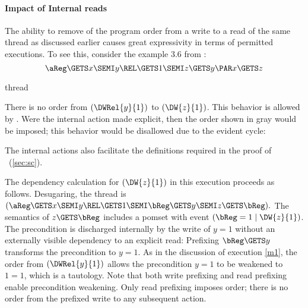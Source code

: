 \paragraph{Impact of Internal reads}
The ability to remove of the program order from a write to a read of the same thread as discussed earlier causes great expressivity in terms of permitted executions.  To see this, consider the example 3.6 from
\cite{DBLP:journals/pacmpl/PodkopaevLV19}:
\begin{displaymath}
  \aReg\GETS x\SEMI
  y\REL\GETS 1\SEMI
  z\GETS y
  \PAR
  x\GETS z
\end{displaymath}

\begin{tikzdisplaylabel}[node distance=1em]{thread}
\end{tikzdisplaylabel}
There is no order from $(\DWRel{y}{1})$ to $(\DW{z}{1})$.  This behavior is
allowed by \armeight.  Were the internal action made explicit, then the order
shown in gray would be imposed; this behavior would be disallowed due to the
evident cycle:
\begin{tikzdisplay}[node distance=1em]
\end{tikzdisplay}
The internal actions also facilitate the definitions required in the proof
of \drfsc\ (\textsection\ref{sec:sc}).  

The dependency calculation for $(\DW{z}{1})$ in this execution proceeds as
follows.  Desugaring, the thread is
\begin{math}
  (\aReg\GETS x\SEMI
  y\REL\GETS 1\SEMI
  \bReg\GETS y\SEMI
  z\GETS \bReg).
\end{math}
The semantics of $z\GETS \bReg$ includes a pomset with event
$(\bReg=1\mid \DW{z}{1})$. The precondition is discharged internally by the
write of $y=1$ without an externally visible dependency to an explicit read:
Prefixing $\bReg\GETS y$ transforms the precondition to $y=1$.  As in the
discussion of execution \eqref{m1}, the order from $(\DWRel{y}{1})$
allows the precondition $y=1$ to be weakened to $1=1$, which is a tautology.
Note that both write prefixing and read prefixing enable precondition
weakening.  Only read prefixing imposes order; there is no order from
the prefixed write to any subsequent action.

